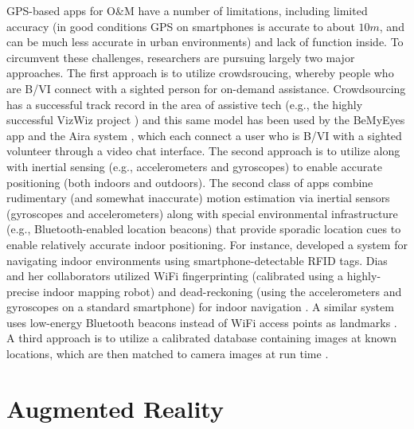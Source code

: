 \documentclass[chi_draft]{sigchi}
\newcommand{\BVI}{B/VI\xspace}
\newcommand{\OM}{O\&M\xspace}
\begin{document}
GPS-based apps for \OM have a number of limitations, including limited accuracy (in good conditions GPS on smartphones is accurate to about $10m$, and can be much less accurate in urban environments) and lack of function inside.  To circumvent these challenges, researchers are pursuing largely two major approaches.  The first approach is to utilize crowdsroucing, whereby people who are \BVI connect with a sighted person for on-demand assistance.  Crowdsourcing has a successful track record in the area of assistive tech (e.g., the highly successful VizWiz project \cite{bigham2010vizwiz}) and this same model has been used by the BeMyEyes app \cite{bemyeyesaccessworld} and the Aira system \cite{aira}, which each connect a user who is \BVI with a sighted volunteer through a video chat interface.  The second approach is to utilize  along with inertial sensing (e.g., accelerometers and gyroscopes) to enable accurate positioning (both indoors and outdoors).  The second class of apps combine rudimentary (and somewhat inaccurate) motion estimation via inertial sensors (gyroscopes and accelerometers) along with special environmental infrastructure (e.g., Bluetooth-enabled location beacons) that provide sporadic location cues to enable relatively accurate indoor positioning.  For instance, \cite{ganz2015percept, ganz2011percept, ganz2014percept} developed a system for navigating indoor environments using smartphone-detectable RFID tags.  Dias and her collaborators utilized WiFi fingerprinting (calibrated using a highly-precise indoor mapping robot) and dead-reckoning (using the accelerometers and gyroscopes on a standard smartphone) for indoor navigation \cite{Dias__2014_7778}.  A similar system uses low-energy Bluetooth beacons instead of WiFi access points as landmarks \cite{ishihara2017beacon, ahmetovic2016navcog, ahmetovic2017achieving}.  A third approach is to utilize a calibrated database containing images at known locations, which are then matched to camera images at run time \cite{bai2014wearable}.

\section{Augmented Reality}
\end{document}
